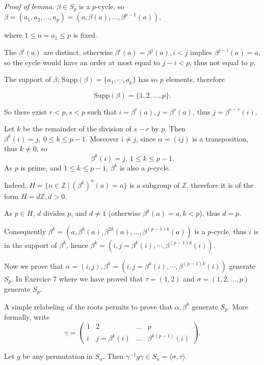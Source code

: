 \documentclass[11pt,a4paper]{article}
\begin{document}
\bigskip

{\it Proof of lemma.}  $\beta \in S_p$ is a $p$-cycle, so $\beta = (a_1,a_2,\ldots,a_p) = (a , \beta(a), \ldots, \beta^{p-1}(a))$, 

where $1 \leq a=a_1\leq p$ is fixed.

The $\beta^i(a)$ are distinct, otherwise $\beta^i(a) = \beta^j(a), i<j$ implies  $ \beta^{j-i}(a) = a$, so the cycle would have an order at most equal to $j-i <p$, thus not equal to $p$.

The support of $\beta$, $\mathrm{Supp}(\beta) = \{a_1,\cdots,a_p\}$ has so $p$ elements, therefore 

$$\mathrm{Supp}(\beta) =\{1,2,\ldots,p\}.$$

So there exist $r<p, s<p$ such that $i = \beta^r(a), j = \beta^s(a)$, thus $j = \beta^{s-r}(i)$.

Let $k$ be the remainder of the division of $s-r$ by $p$. Then $\beta^k(i) = j,\ 0 \leq k \leq p-1.$
Moreover $i\neq j$, since $\alpha = (i j)$ is a transposition, thus $k\neq 0$, so
$$\beta^k(i) = j,\  1 \leq k \leq p-1.$$
As $p$ is prime, and $1 \leq k \leq p-1$, $\beta^k$ is also a $p$-cycle.

 Indeed,  $H = \{n \in \mathbb{Z} \ \vert  \ (\beta^k)^n(a) = a\}$ is a subgroup of $\mathbb{Z}$, therefore it is of the form $H=d\mathbb{Z}, d>0$.

As $p \in H$, $d$ divides $p$, and $d \neq 1$ (otherwise $\beta^k(a) = a, k<p $), thus $d = p$.

Consequently $\beta^k = (a, \beta^k(a), \beta^{2k}(a), \ldots,\beta^{(p-1)k}(a))$ is a $p$-cycle, thus $i$ is in the support of $\beta^k$, hence $ \beta^k = (i , j = \beta^k(i), \cdots,\beta^{(p-1)k}(i) )$.

Now we prove that $\alpha= (i,j), \beta^k = (i , j = \beta^k(i), \cdots,\beta^{(p-1)k}(i) )$ generate  $S_p$. In Exercice 7 where we have proved that $\tau = (1,2)$ and $\sigma = (1,2,\ldots,p)$ generate $S_p$.

A simple relabeling of the roots permits to prove that $\alpha,\beta^k$ generate $S_p$. More formally, write
 $$\gamma =
\left(
\begin{array}{cccc}
  1 & 2  & \ldots & p \\
   i &  j = \beta^k(i) & \ldots & \beta^{k(p-1)}(i) 
\end{array}
\right).
$$

Let $g $ be any permutation in $S_n$. Then $\gamma^{-1} g \gamma \in S_n = \langle \sigma, \tau \rangle$. 
\end{document}
